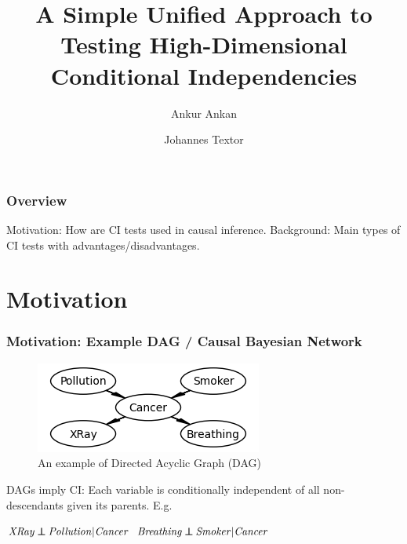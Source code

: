 \documentclass{beamer}
\def\ci{\perp\!\!\!\!\!\perp}
\begin{document}
\title{A Simple Unified Approach to Testing High-Dimensional Conditional Independencies}
\author {Ankur Ankan \and Johannes Textor}
\date{}
\maketitle

\begin{frame}
	\frametitle{Overview}
	\tableofcontents
	Motivation: How are CI tests used in causal inference.
	Background: Main types of CI tests with advantages/disadvantages.
\end{frame}

\section{Motivation}
\begin{frame}
	\frametitle{Motivation: Example DAG / Causal Bayesian Network}
	\begin{figure}
		\centering
		\includegraphics[scale=0.6]{imgs/example_dag.png}
		\caption*{An example of Directed Acyclic Graph (DAG) \footnotemark}
	\end{figure}
	DAGs imply CI: Each variable is conditionally independent of all non-descendants given its parents. E.g. \newline

			\hspace*{20pt} $ \text{\emph{XRay}} \ci \text{\emph{Pollution}} | \text{\emph{Cancer}} $ \newline
			\hspace*{20pt} $ \text{\emph{Breathing}} \ci \text{\emph{Smoker}} | \text{\emph{Cancer}} $
\end{frame}
\end{document}
